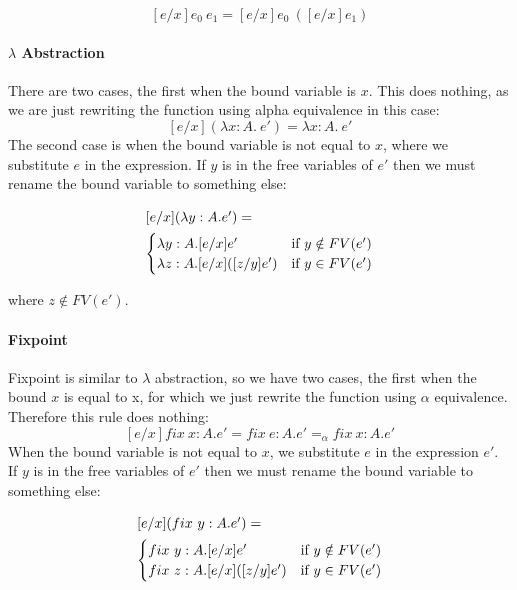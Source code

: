 \[ [e/x] e_0 \ e_1 = [e/x]e_0 \ ([e/x]e_1) \]

\paragraph{$\lambda$ Abstraction} There are two cases, the first when the bound variable is $x$. This does nothing, as we are just rewriting the function using alpha equivalence in this case:
\[ [e/x](\lambda x:A. \ e') = \lambda x:A. \ e' \]
The second case is when the bound variable is not equal to $x$, where we substitute $e$ in the expression. If $y$ is in the free variables of $e'$ then we must rename the bound variable to something else:

\begin{minipage}{4in}
\begin{align*}
\intertext{$[e/x](\lambda y:A.e')=$}
  \begin{cases}
            \lambda y:A. [e/x]e' & \text{if } y \notin FV(e')  \\
           \lambda z:A. [e/x]([z/y]e') & \text{if } y \in FV(e')
  \end{cases}
\end{align*} 
\end{minipage}

where $z \notin FV(e')$.

\paragraph{Fixpoint} Fixpoint is similar to $\lambda$ abstraction, so we have two cases, the first when the bound $x$ is equal to x, for which we just rewrite the function using $\alpha$ equivalence. Therefore this rule does nothing:
\[ [e/x] fix \ x:A. e' = fix \ e:A. e' =_{\alpha} fix \ x:A. e'\]
When the bound variable is not equal to $x$, we substitute $e$ in the expression $e'$. If $y$ is in the free variables of $e'$ then we must rename the bound variable to something else:

\begin{minipage}{4in}
\begin{align*}
\intertext{$[e/x](fix \ y:A.e')=$}
  \begin{cases}
            fix \ y:A. [e/x]e' & \text{if } y \notin FV(e')  \\
           fix \ z:A. [e/x]([z/y]e') & \text{if } y \in FV(e')
  \end{cases}
\end{align*} 
\end{minipage}

